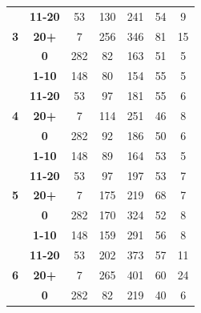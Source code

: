 \documentclass[sigconf,review]{acmart}
\begin{document}
\begin{table}
{\begin{tabular}{|c@{~}|c@{~}|c@{~}|c@{~}|c@{~}|c@{~}|c|}
 & \textbf{11-20} & 53 & 130 & \cellcolor[HTML]{C0C0C0}241 & \cellcolor[HTML]{C0C0C0}54 & \cellcolor[HTML]{C0C0C0}9 \\ \cline{2-7} 
\multirow{-4}{*}{\textbf{3}} & \textbf{20+} & 7 & 256 & \cellcolor[HTML]{C0C0C0}346 & \cellcolor[HTML]{C0C0C0}81 & 15 \\ \hline
 & \textbf{0} & 282 & \cellcolor[HTML]{C0C0C0}82 & \cellcolor[HTML]{C0C0C0}163 & \cellcolor[HTML]{C0C0C0}51 & \cellcolor[HTML]{C0C0C0}5 \\ \cline{2-7} 
 & \textbf{1-10} & 148 & \cellcolor[HTML]{C0C0C0}80 & \cellcolor[HTML]{C0C0C0}154 & \cellcolor[HTML]{C0C0C0}55 & \cellcolor[HTML]{C0C0C0}5 \\ \cline{2-7} 
 & \textbf{11-20} & 53 & 97 & \cellcolor[HTML]{C0C0C0}181 & \cellcolor[HTML]{C0C0C0}55 & \cellcolor[HTML]{C0C0C0}6 \\ \cline{2-7} 
\multirow{-4}{*}{\textbf{4}} & \textbf{20+} & 7 & 114 & \cellcolor[HTML]{C0C0C0}251 & \cellcolor[HTML]{C0C0C0}46 & \cellcolor[HTML]{C0C0C0}8 \\ \hline
 & \textbf{0} & 282 & \cellcolor[HTML]{C0C0C0}92 & \cellcolor[HTML]{C0C0C0}186 & \cellcolor[HTML]{C0C0C0}50 & \cellcolor[HTML]{C0C0C0}6 \\ \cline{2-7} 
 & \textbf{1-10} & 148 & \cellcolor[HTML]{C0C0C0}89 & \cellcolor[HTML]{C0C0C0}164 & \cellcolor[HTML]{C0C0C0}53 & \cellcolor[HTML]{C0C0C0}5 \\ \cline{2-7} 
 & \textbf{11-20} & 53 & 97 & \cellcolor[HTML]{C0C0C0}197 & \cellcolor[HTML]{C0C0C0}53 & 7 \\ \cline{2-7} 
\multirow{-4}{*}{\textbf{5}} & \textbf{20+} & 7 & 175 & \cellcolor[HTML]{C0C0C0}219 & \cellcolor[HTML]{C0C0C0}68 & 7 \\ \hline
 & \textbf{0} & 282 & \cellcolor[HTML]{C0C0C0}170 & \cellcolor[HTML]{C0C0C0}324 & \cellcolor[HTML]{C0C0C0}52 & \cellcolor[HTML]{C0C0C0}8 \\ \cline{2-7} 
 & \textbf{1-10} & 148 & \cellcolor[HTML]{C0C0C0}159 & \cellcolor[HTML]{C0C0C0}291 & \cellcolor[HTML]{C0C0C0}56 & \cellcolor[HTML]{C0C0C0}8 \\ \cline{2-7} 
 & \textbf{11-20} & 53 & 202 & \cellcolor[HTML]{C0C0C0}373 & \cellcolor[HTML]{C0C0C0}57 & \cellcolor[HTML]{C0C0C0}11 \\ \cline{2-7} 
\multirow{-4}{*}{\textbf{6}} & \textbf{20+} & 7 & 265 & \cellcolor[HTML]{C0C0C0}401 & \cellcolor[HTML]{C0C0C0}60 & \cellcolor[HTML]{C0C0C0}24 \\ \hline
 & \textbf{0} & 282 & \cellcolor[HTML]{C0C0C0}82 & 219 & \cellcolor[HTML]{C0C0C0}40 & \cellcolor[HTML]{C0C0C0}6 \\ \cline{2-7} 

\end{tabular}}
\end{table}
\end{document}
